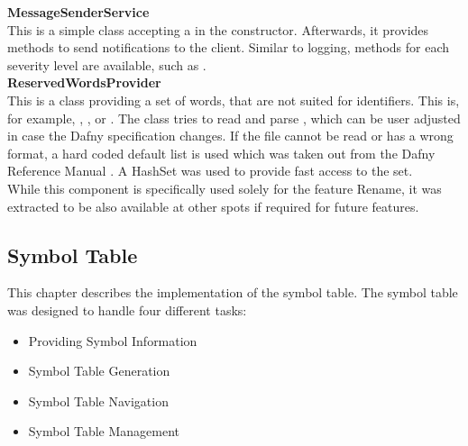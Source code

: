 \textbf{MessageSenderService}\\
This is a simple class accepting a  in the constructor.
Afterwards, it provides methods to send notifications to the client.
Similar to logging, methods for each severity level are available, such as .\\

\textbf{ReservedWordsProvider}\\
This is a class providing a set of words, that are not suited for identifiers.
This is, for example, , , or .
The class tries to read and parse , which can be user adjusted in case the Dafny specification changes.
If the file cannot be read or has a wrong format, a hard coded default list is used which was taken out from the Dafny Reference Manual \cite{dafnyReferenceManual}.
A HashSet was used to provide fast access to the set.\\

While this component is specifically used solely for the feature Rename,
it was extracted to be also available at other spots if required for future features.


\subsection{Symbol Table}
This chapter describes the implementation of the symbol table.
The symbol table was designed to handle four different tasks:

\begin{itemize}
    \item Providing Symbol Information
    \item Symbol Table Generation
    \item Symbol Table Navigation
    \item Symbol Table Management
\end{itemize}

